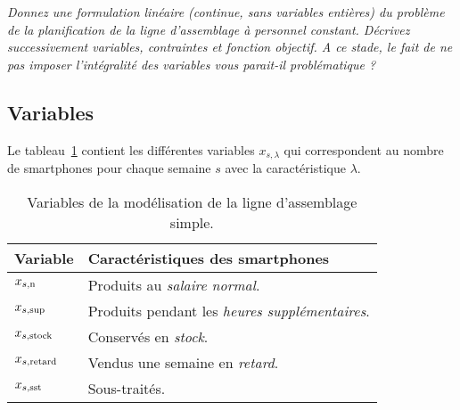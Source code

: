 \question %
\emph{Donnez une formulation linéaire (continue, sans variables entières)
du problème de la planification de la ligne d'assemblage à personnel constant.
Décrivez successivement variables, contraintes et fonction objectif.
A ce stade, le fait de ne pas imposer l'intégralité des variables
vous parait-il problématique ?}

\subsection*{Variables}
Le tableau~\ref{tab:variablesQuestion1} contient les différentes variables $x_{s,\lambda}$
qui correspondent au nombre de smartphones pour chaque semaine $s$
avec la caractéristique $\lambda$.

\begin{table}[h]
  \begin{center}
  \begin{tabular}{|l|l|}
    \hline
    Variable & Caractéristiques des smartphones \\
    \hline
    \hline
    $x_{s,\text{n}}$ & Produits au \emph{salaire normal}. \\
    \hline
    $x_{s,\text{sup}}$ & Produits pendant les \emph{heures supplémentaires}. \\
    \hline
    $x_{s,\text{stock}}$ & Conservés en \emph{stock}. \\
    \hline
    $x_{s,\text{retard}}$ & Vendus une semaine en \emph{retard}. \\
    \hline
    $x_{s,\text{sst}}$ & Sous-traités. \\
    \hline
  \end{tabular}
  \caption{Variables de la modélisation de la ligne d'assemblage simple.}
  \label{tab:variablesQuestion1}
  \end{center}
\end{table}

